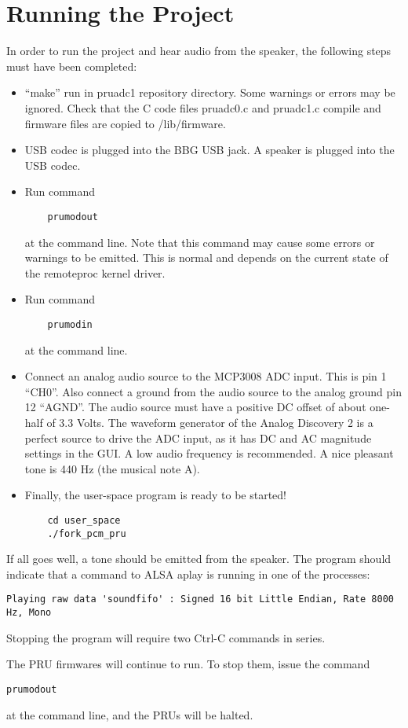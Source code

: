 \chapter{Running the Project}

In order to run the project and hear audio from the speaker, the following steps must have been completed:

\begin{itemize}
	\item ``make'' run in pruadc1 repository directory.  Some warnings or errors may be ignored.  Check that the C code files pruadc0.c and pruadc1.c compile and firmware files are copied to /lib/firmware.
	\item USB codec is plugged into the BBG USB jack.  A speaker is plugged into the USB codec.
	\item Run command 
	
	\begin{verbatim}
	prumodout
	\end{verbatim} 
	
	at the command line.  Note that this command may cause some errors or warnings to be emitted.
	This is normal and depends on the current state of the remoteproc kernel driver.
	\item Run command 
	
	\begin{verbatim}
	prumodin
	\end{verbatim} 
	
	at the command line.
	\item Connect an analog audio source to the MCP3008 ADC input.  This is pin 1 ``CH0''.  Also connect a ground from the audio source to the analog ground pin 12 ``AGND''.  The audio source must have a positive DC offset of about one-half of 3.3 Volts.  The waveform generator of the Analog Discovery 2 is a perfect source to drive the ADC input, as it has DC and AC magnitude settings in the GUI.  A low audio frequency is recommended.  A nice pleasant tone is 440 Hz (the musical note A).
	\item  Finally, the user-space program is ready to be started!
	
	\begin{verbatim}
	cd user_space
	./fork_pcm_pru
	\end{verbatim}
\end{itemize}

If all goes well, a tone should be emitted from the speaker.  The program should indicate that a command to ALSA aplay is running in one of the processes:

\begin{verbatim}
Playing raw data 'soundfifo' : Signed 16 bit Little Endian, Rate 8000 Hz, Mono
\end{verbatim}

Stopping the program will require two Ctrl-C commands in series.

The PRU firmwares will continue to run.  To stop them, issue the command

\begin{verbatim}
prumodout
\end{verbatim}

at the command line, and the PRUs will be halted.

